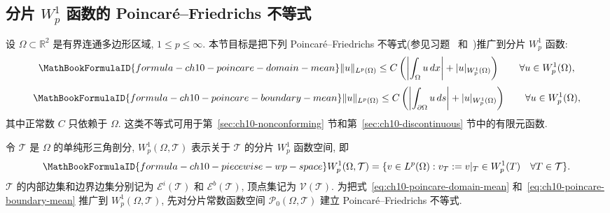 \subsection{\texorpdfstring{分片 $W_p^1$ 函数的 Poincaré--Friedrichs 不等式}{分片 Wp1 函数的 Poincaré--Friedrichs 不等式}}
\label{sec:ch10-piecewise-poincare-friedrichs}
\setcounter{thmcount}{0}
\setcounter{equation}{0}

设 $\Omega\subset\mathbb R^2$ 是有界连通多边形区域, $1\leq p\leq\infty$. 本节目标是把下列 Poincaré--Friedrichs 不等式(参见习题~ 和~)推广到分片 $W_p^1$ 函数:
\begin{equation}
\MathBookFormulaID{formula-ch10-poincare-domain-mean}
\label{eq:ch10-poincare-domain-mean}
\|u\|_{L^p(\Omega)}\leq C\left(\left|\int_\Omega u\,dx\right|+|u|_{W_p^1(\Omega)}\right)
\qquad\forall u\in W_p^1(\Omega),
\end{equation}
\begin{equation}
\MathBookFormulaID{formula-ch10-poincare-boundary-mean}
\label{eq:ch10-poincare-boundary-mean}
\|u\|_{L^p(\Omega)}\leq C\left(\left|\int_{\partial\Omega}u\,ds\right|+|u|_{W_p^1(\Omega)}\right)
\qquad\forall u\in W_p^1(\Omega),
\end{equation}
其中正常数 $C$ 只依赖于 $\Omega$. 这类不等式可用于第~\ref{sec:ch10-nonconforming} 节和第~\ref{sec:ch10-discontinuous} 节中的有限元函数.

令 $\mathcal T$ 是 $\Omega$ 的单纯形三角剖分, $W_p^1(\Omega,\mathcal T)$ 表示关于 $\mathcal T$ 的分片 $W_p^1$ 函数空间, 即
\begin{equation}
\MathBookFormulaID{formula-ch10-piecewise-wp-space}
\label{eq:ch10-piecewise-wp-space}
W_p^1(\Omega,\mathcal T)
=\{v\in L^p(\Omega):v_T:=v|_T\in W_p^1(T)\quad\forall T\in\mathcal T\}.
\end{equation}
$\mathcal T$ 的内部边集和边界边集分别记为 $\mathcal E^i(\mathcal T)$ 和 $\mathcal E^b(\mathcal T)$, 顶点集记为 $\mathcal V(\mathcal T)$. 为把式~\eqref{eq:ch10-poincare-domain-mean} 和~\eqref{eq:ch10-poincare-boundary-mean} 推广到 $W_p^1(\Omega,\mathcal T)$, 先对分片常数函数空间 $\mathcal P_0(\Omega,\mathcal T)$ 建立 Poincaré--Friedrichs 不等式.

